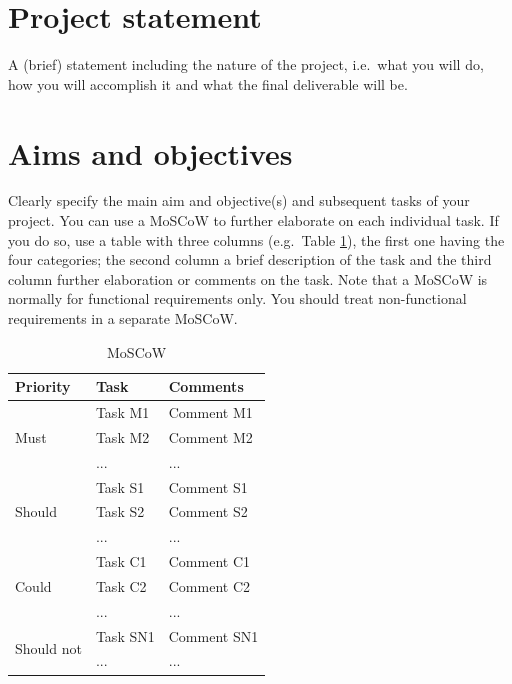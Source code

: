 \documentclass[a4paper, oneside, 11pt]{report}
\begin{document}
\section{Project statement}
A (brief) statement including the nature of the project, i.e.\ what you will do, how you will accomplish it and what the final deliverable will be.

\section{Aims and objectives}

Clearly specify the main aim and objective(s) and subsequent tasks of your project. You can use a MoSCoW to further elaborate on each individual task. If you do so, use a table with three columns (e.g.\ Table \ref{Table1}), the first one having the four categories; the second column a brief description of the task and the third column further elaboration or comments on the task. Note that a MoSCoW is normally for functional requirements only. You should treat non-functional requirements in a separate MoSCoW.

\begin{table}[h]
\caption{MoSCoW}
\begin{center}
\begin{tabular}{|p{1in}|p{2in}|p{2.5in}|} \hline
Priority & Task & Comments \\ \hline \hline
\multirow{3}{1in}{Must}
& Task M1 & Comment M1 \\ \cline{2-3}
& Task M2 & Comment M2 \\ \cline{2-3}
& ... & ... \\ \hline \hline
\multirow{3}{1in}{Should}
& Task S1 & Comment S1 \\ \cline{2-3}
& Task S2 & Comment S2 \\ \cline{2-3}
& ... & ... \\ \hline \hline
\multirow{3}{1in}{Could}
& Task C1 & Comment C1 \\ \cline{2-3}
& Task C2 & Comment C2 \\ \cline{2-3}
& ... & ... \\ \hline \hline
\multirow{3}{1in}{Should not}
& Task SN1 & Comment SN1 \\ \cline{2-3}
& ... & ... \\ \hline
\end{tabular}
\label{Table1}
\end{center}
\end{table}
\end{document}
